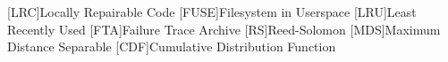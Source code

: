 \begin{acronym}
[LRC]{Locally Repairable Code}
[FUSE]{Filesystem in Userspace}
[LRU]{Least Recently Used}
[FTA]{Failure Trace Archive}
[RS]{Reed-Solomon}
[MDS]{Maximum Distance Separable}
[CDF]{Cumulative Distribution Function}
\end{acronym}

